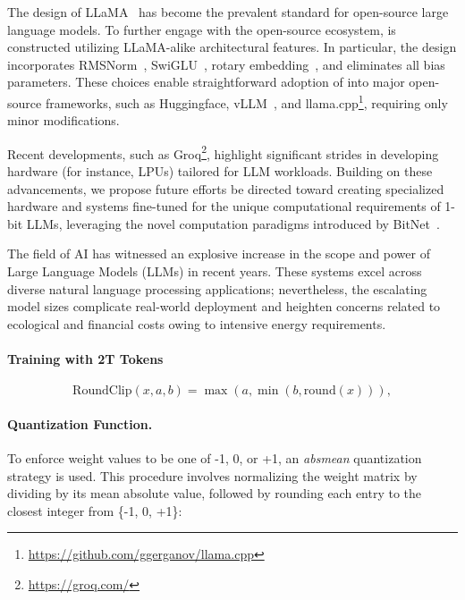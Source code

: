 The design of LLaMA~\cite{llama, llama2} has become the prevalent standard for open-source large language models. To further engage with the open-source ecosystem,  is constructed utilizing LLaMA-alike architectural features. In particular, the design incorporates RMSNorm~\cite{rmsnorm}, SwiGLU~\cite{swiglu}, rotary embedding~\cite{rope}, and eliminates all bias parameters. These choices enable straightforward adoption of  into major open-source frameworks, such as Huggingface, vLLM~\cite{vllm}, and llama.cpp\footnote{\url{https://github.com/ggerganov/llama.cpp}}, requiring only minor modifications.

Recent developments, such as Groq\footnote{\url{https://groq.com/}}, highlight significant strides in developing hardware (for instance, LPUs) tailored for LLM workloads. Building on these advancements, we propose future efforts be directed toward creating specialized hardware and systems fine-tuned for the unique computational requirements of 1-bit LLMs, leveraging the novel computation paradigms introduced by BitNet~\cite{bitnet}.

The field of AI has witnessed an explosive increase in the scope and power of Large Language Models (LLMs) in recent years. These systems excel across diverse natural language processing applications; nevertheless, the escalating model sizes complicate real-world deployment and heighten concerns related to ecological and financial costs owing to intensive energy requirements.

\paragraph{Training with 2T Tokens}

\begin{equation}
    \mathrm{RoundClip}(x, a, b) = \max(a, \min(b, \mathrm{round}(x))),
\end{equation}

\paragraph{Quantization Function.} To enforce weight values to be one of -1, 0, or +1, an \emph{absmean} quantization strategy is used. This procedure involves normalizing the weight matrix by dividing by its mean absolute value, followed by rounding each entry to the closest integer from \{-1, 0, +1\}:



